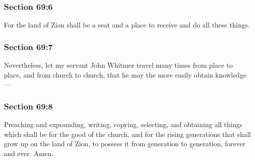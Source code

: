 
	\subsubsection{Section 69:6} %
		\label{DC69-6}

		For the land of Zion shall be a seat and a place to receive and do all these things.


	\subsubsection{Section 69:7} %
		\label{DC69-7}

		Nevertheless, let my servant John Whitmer travel many times from place to place, and from church to church, that he may the more easily obtain knowledge---


	\subsubsection{Section 69:8} %
		\label{DC69-8}

		Preaching and expounding, writing, copying, selecting, and obtaining all things which shall be for the good of the church, and for the rising generations that shall grow up on the land of Zion, to possess it from generation to generation, forever and ever.  Amen.

